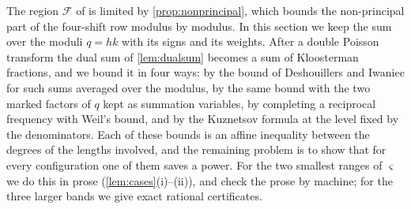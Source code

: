 \documentclass[11pt,colorlinks]{charlie}
\begin{document}
The region $\mathcal F$ of  is limited by \cref{prop:nonprincipal}, which bounds the non-principal part of the four-shift row modulus by modulus. In this section we keep the sum over the moduli $q=hk$ with its signs and its weights. After a double Poisson transform the dual sum of \cref{lem:dualsum} becomes a sum of Kloosterman fractions, and we bound it in four ways: by the bound of Deshouillers and Iwaniec for such sums averaged over the modulus, by the same bound with the two marked factors of $q$ kept as summation variables, by completing a reciprocal frequency with Weil's bound, and by the Kuznetsov formula at the level fixed by the denominators. Each of these bounds is an affine inequality between the degrees of the lengths involved, and the remaining problem is to show that for every configuration one of them saves a power. For the two smallest ranges of $\varsigma$ we do this in prose (\cref{lem:cases}(i)--(ii)), and check the prose by machine; for the three larger bands we give exact rational certificates.
\end{document}
